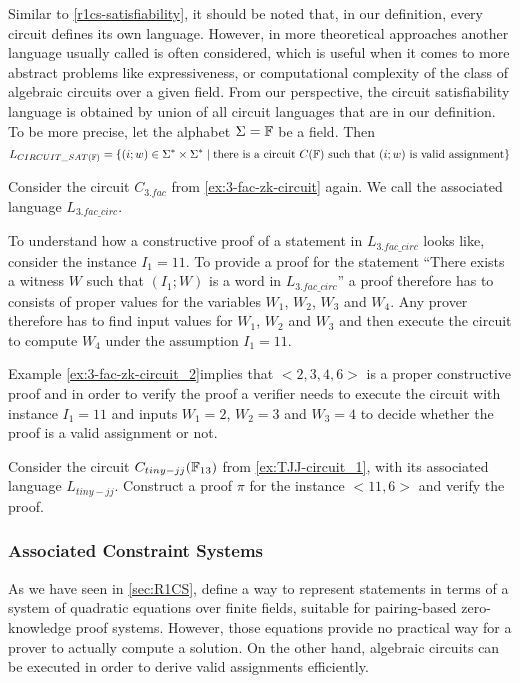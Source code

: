 \begin{remark} Similar to \ref{r1cs-satisfiability}, it should be noted that, in our definition, every circuit defines its own language. However, in more theoretical approaches another language usually called  is often considered, which is useful when it comes to more abstract problems like expressiveness, or computational complexity of the class of  algebraic circuits over a given field. From our perspective, the circuit satisfiability language is obtained by union of all circuit languages that are in our definition. To be more precise, let the alphabet $\Sigma=\mathbb{F}$ be a field. Then 
$$
L_{CIRCUIT\_SAT(\mathbb{F})} = \{(i;w)\in \Sigma^*\times \Sigma^*\;|\; \text{there is a circuit } C(\mathbb{F}) \text{ such that } (i;w) \text{ is valid assignment}\}
$$
\end{remark}
\begin{example}[3-Factorization]Consider the circuit $C_{3.fac}$ from \examplename{} \ref{ex:3-fac-zk-circuit} again. We call the associated language $L_{3.fac\_circ}$.

To understand how a constructive proof of a statement in $L_{3.fac\_circ}$ looks like, consider the instance $I_1= 11$. To provide a proof for the statement ``There exists a witness $W$ such that $(I_1;W)$ is a word in $L_{3.fac\_circ}$'' a proof therefore has to consists of proper values for the variables $W_1$, $W_2$, $W_3$ and $W_4$. Any prover therefore has to find input values for $W_1$, $W_2$ and $W_3$ and then execute the circuit to compute $W_4$ under the assumption $I_1=11$. 

Example \ref{ex:3-fac-zk-circuit_2}implies that $<2,3,4,6>$ is a proper constructive proof and in order to verify the proof a verifier needs to execute the circuit with instance $I_1=11$ and inputs $W_1=2$, $W_2=3$ and $W_3=4$ to decide whether the proof is a valid assignment or not. 
\end{example}
\begin{exercise}
Consider the circuit $C_{tiny-jj}(\mathbb{F}_{13})$ from \examplename{} \ref{ex:TJJ-circuit_1}, with its associated language $L_{tiny-jj}$. Construct a proof $\pi$ for the instance $<11,6>$ and verify the proof.
\end{exercise}

\subsubsection{Associated Constraint Systems}
\label{sec:circuits_associated_R1CS} As we have seen in \ref{sec:R1CS},  define a way to represent statements in terms of a system of quadratic equations over finite fields, suitable for pairing-based zero-knowledge proof systems. However,  those equations provide no practical way for a prover to actually compute a solution. On the other hand, algebraic circuits can be executed in order to derive valid assignments efficiently. 

